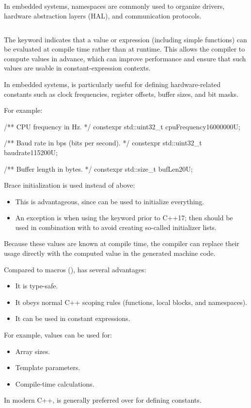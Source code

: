\note[In short] In embedded systems, namespaces are commonly used to organize drivers, hardware
abstraction layers (HAL), and communication protocols.

\subsection{}
\label{c1:sec:constexpr}
The keyword  indicates that a value or expression (including simple functions) can
be evaluated at compile time rather than at runtime. This allows the compiler to compute values in
advance, which can improve performance and ensure that such values are usable in
constant-expression contexts.

In embedded systems,  is particularly useful for defining hardware-related
constants such as clock frequencies, register offsets, buffer sizes, and bit masks.

For example:

\begin{cppcode}
/** CPU frequency in Hz. */
constexpr std::uint32_t cpuFrequency{16000000U};

/** Baud rate in bps (bits per second). */
constexpr std::uint32_t baudrate{115200U};

/** Buffer length in bytes. */
constexpr std::size_t bufLen{20U};
\end{cppcode}

\note Brace initialization \code{{}} is used instead of \code{=} above:
\begin{itemize}
  \item This is advantageous, since \code{{}} can be used to initialize everything.
  \item An exception is when using the  keyword prior to C++17; then  should
    be used in combination with \code{=} to avoid creating so-called initializer lists.
\end{itemize}

Because these values are known at compile time, the compiler can replace their usage directly with
the computed value in the generated machine code.

Compared to macros (),  has several advantages:
\begin{itemize}
  \item It is type-safe.
  \item It obeys normal C++ scoping rules (functions, local blocks, and namespaces).
  \item It can be used in constant expressions.
\end{itemize}
For example,  values can be used for:
\begin{itemize}
  \item Array sizes.
  \item Template parameters.
  \item Compile-time calculations.
\end{itemize}
In modern C++,  is generally preferred over  for defining constants.

